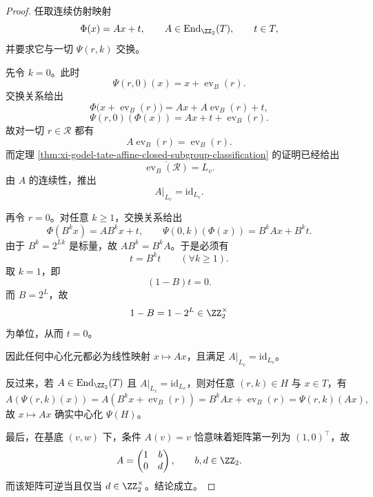 \begin{proof}
任取连续仿射映射
\[
\Phi(x)=Ax+t,
\qquad
A\in \operatorname{End}_{\ZZ_2}(T),
\qquad
t\in T,
\]
并要求它与一切 \(\Psi(r,k)\) 交换。

先令 \(k=0\)。此时
\[
\Psi(r,0)(x)=x+\operatorname{ev}_B(r).
\]
交换关系给出
\[
\Phi\bigl(x+\operatorname{ev}_B(r)\bigr)
=
Ax+A\operatorname{ev}_B(r)+t,
\]
\[
\Psi(r,0)(\Phi(x))
=
Ax+t+\operatorname{ev}_B(r).
\]
故对一切 \(r\in\mathcal R\) 都有
\[
A\operatorname{ev}_B(r)=\operatorname{ev}_B(r).
\]
而定理 \ref{thm:xi-godel-tate-affine-closed-subgroup-classification} 的证明已经给出
\[
\overline{\operatorname{ev}_B(\mathcal R)}=L_v.
\]
由 \(A\) 的连续性，推出
\[
A|_{L_v}=\mathrm{id}_{L_v}.
\]

再令 \(r=0\)。对任意 \(k\ge 1\)，交换关系给出
\[
\Phi(B^k x)=AB^k x+t,
\qquad
\Psi(0,k)(\Phi(x))=B^kAx+B^k t.
\]
由于 \(B^k=2^{Lk}\) 是标量，故 \(AB^k=B^kA\)。于是必须有
\[
t=B^k t
\qquad (\forall k\ge 1).
\]
取 \(k=1\)，即
\[
(1-B)t=0.
\]
而 \(B=2^L\)，故
\[
1-B=1-2^L\in \ZZ_2^\times
\]
为单位，从而 \(t=0\)。

因此任何中心化元都必为线性映射 \(x\mapsto Ax\)，且满足 \(A|_{L_v}=\mathrm{id}_{L_v}\)。

反过来，若 \(A\in \operatorname{End}_{\ZZ_2}(T)\) 且 \(A|_{L_v}=\mathrm{id}_{L_v}\)，则对任意 \((r,k)\in H\) 与 \(x\in T\)，有
\[
A(\Psi(r,k)(x))
=
A(B^k x+\operatorname{ev}_B(r))
=
B^kAx+\operatorname{ev}_B(r)
=
\Psi(r,k)(Ax),
\]
故 \(x\mapsto Ax\) 确实中心化 \(\Psi(H)\)。

最后，在基底 \((v,w)\) 下，条件 \(A(v)=v\) 恰意味着矩阵第一列为 \((1,0)^\top\)，故
\[
A=
\begin{pmatrix}
1 & b\\
0 & d
\end{pmatrix},
\qquad
b,d\in\ZZ_2.
\]
而该矩阵可逆当且仅当 \(d\in\ZZ_2^\times\)。结论成立。
\end{proof}

